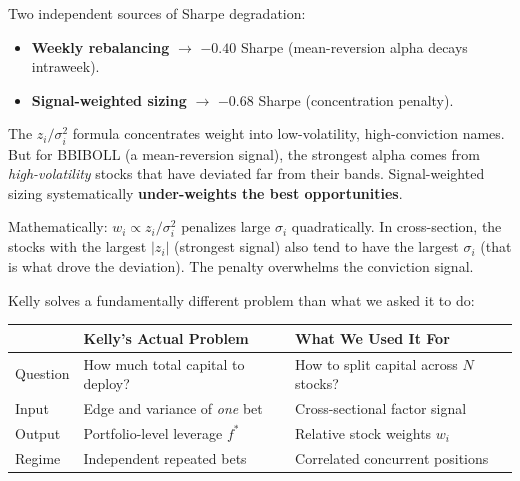 \documentclass[a4paper, 11pt]{report}
\theoremstyle{definition}
\theoremstyle{remark}
\begin{document}
\begin{description}[style=nextline, leftmargin=1.8cm]
        \medskip\noindent
        Two independent sources of Sharpe degradation:
        \begin{itemize}[nosep]
            \item \textbf{Weekly rebalancing} $\to$ $-0.40$ Sharpe
                  (mean-reversion alpha decays intraweek).
            \item \textbf{Signal-weighted sizing} $\to$ $-0.68$ Sharpe
                  (concentration penalty).
        \end{itemize}

    \item[Root Cause --- Why ``Kelly Sizing'' Hurts]
        The $z_i / \sigma_i^2$ formula concentrates weight into
        low-volatility, high-conviction names.  But for BBIBOLL
        (a mean-reversion signal), the strongest alpha comes from
        \emph{high-volatility} stocks that have deviated far from
        their bands.  Signal-weighted sizing systematically
        \textbf{under-weights the best opportunities}.

        \medskip
        Mathematically: $w_i \propto z_i / \sigma_i^2$ penalizes
        large $\sigma_i$ quadratically.  In cross-section, the stocks
        with the largest $|z_i|$ (strongest signal) also tend to have
        the largest $\sigma_i$ (that is what drove the deviation).
        The penalty overwhelms the conviction signal.

    \item[The Conceptual Error]
        Kelly solves a fundamentally different problem than what
        we asked it to do:
        \begin{center}
        \begin{tabular}{@{}lp{5.5cm}p{5.5cm}@{}}
        \toprule
        & \textbf{Kelly's Actual Problem} & \textbf{What We Used It For} \\
        \midrule
        Question & How much total capital to deploy?
                 & How to split capital across $N$ stocks? \\
        Input    & Edge and variance of \emph{one} bet
                 & Cross-sectional factor signal \\
        Output   & Portfolio-level leverage $f^*$
                 & Relative stock weights $w_i$ \\
        Regime   & Independent repeated bets
                 & Correlated concurrent positions \\
        \bottomrule
        \end{tabular}
        \end{center}


\end{description}
\end{document}
